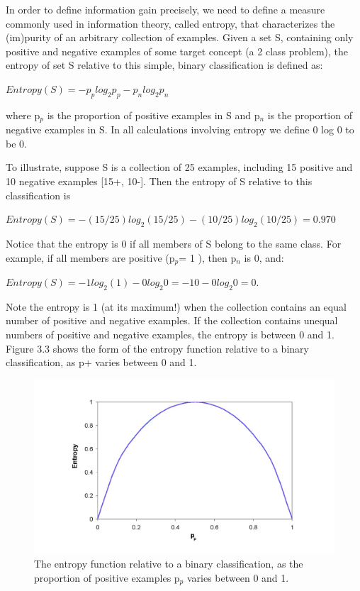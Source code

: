 \documentclass[12pt]{report}
\begin{document}
In order to define information gain precisely, we need to define a measure commonly used in information theory, called entropy, that characterizes the (im)purity of an arbitrary collection of examples. Given a set S, containing only positive and negative examples of some target concept (a 2 class problem), the entropy of set S relative to this simple, binary classification is defined as:

\begin{math} Entropy(S) =  - p_{p}log_{2} p_{p} - p_{n}log_{2} p_{n} 
\end{math}

where p$_{p}$ is the proportion of positive examples in S and p$_{n}$ is the proportion of negative examples in S. In all calculations involving entropy we define 0 log 0 to be 0. 

To illustrate, suppose S is a collection of 25 examples, including 15 positive and 10 negative examples [15+, 10-]. Then the entropy of S relative to this classification is 

\begin{math} Entropy(S) = - (15/25) log_{2} (15/25) - (10/25) log_{2} (10/25) = 0.970 \end{math}


Notice that the entropy is 0 if all members of S belong to the same class. For example, if all members are positive (p$_{p}$= 1 ), then p$_{n}$ is 0, and:

\begin{math}Entropy(S) = -1 log_{2}(1) - 0 log_{2}0 = -1 0 - 0 log_{2}0 = 0. \end{math}

Note the entropy is 1 (at its maximum!) when the collection contains an equal number of positive and negative examples. If the collection contains unequal numbers of positive and negative examples, the entropy is between 0 and 1. Figure 3.3 shows the form of the entropy function relative to a binary classification, as p+ varies between 0 and 1. 


\begin{figure}[h!]
	\centering
		\includegraphics[scale=0.5]{entropy_graph.jpg}
	\caption{The entropy function relative to a binary classification, as the proportion of positive examples p$_{p}$ varies between 0 and 1.}
	\label{fig:ID3}
\end{figure}
\end{document}
